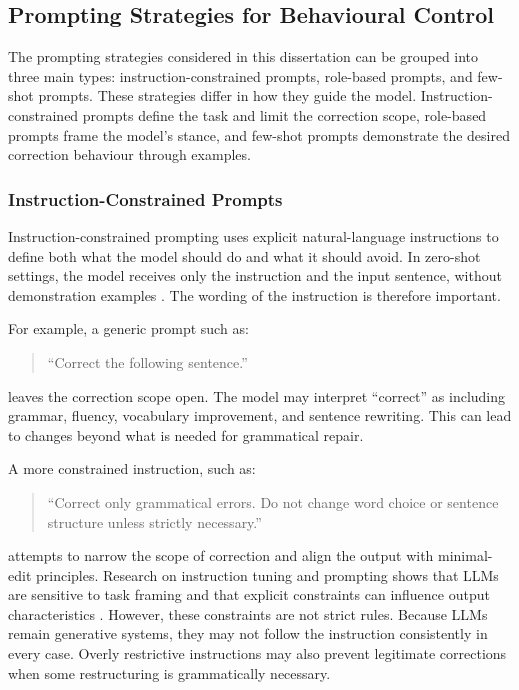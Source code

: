 \subsection{Prompting Strategies for Behavioural Control}

The prompting strategies considered in this dissertation can be grouped into three main types: instruction-constrained prompts, role-based prompts, and few-shot prompts. These strategies differ in how they guide the model. Instruction-constrained prompts define the task and limit the correction scope, role-based prompts frame the model's stance, and few-shot prompts demonstrate the desired correction behaviour through examples.

\subsubsection{Instruction-Constrained Prompts}

Instruction-constrained prompting uses explicit natural-language instructions to define both what the model should do and what it should avoid. In zero-shot settings, the model receives only the instruction and the input sentence, without demonstration examples \cite{NEURIPS2020_1457c0d6}. The wording of the instruction is therefore important.

For example, a generic prompt such as:

\begin{quote}
``Correct the following sentence.''
\end{quote}

leaves the correction scope open. The model may interpret ``correct'' as including grammar, fluency, vocabulary improvement, and sentence rewriting. This can lead to changes beyond what is needed for grammatical repair.

A more constrained instruction, such as:

\begin{quote}
``Correct only grammatical errors. Do not change word choice or sentence structure unless strictly necessary.''
\end{quote}

attempts to narrow the scope of correction and align the output with minimal-edit principles. Research on instruction tuning and prompting shows that LLMs are sensitive to task framing and that explicit constraints can influence output characteristics \cite{wei2022finetuned,liu2023pretrain}. However, these constraints are not strict rules. Because LLMs remain generative systems, they may not follow the instruction consistently in every case. Overly restrictive instructions may also prevent legitimate corrections when some restructuring is grammatically necessary.

